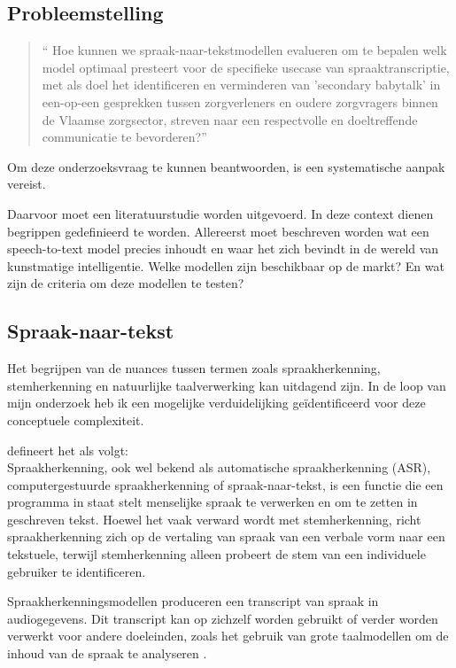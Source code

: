 \subsection{Probleemstelling}
\begin{quote}
   `` Hoe kunnen we spraak-naar-tekstmodellen evalueren om te bepalen welk model optimaal presteert voor de specifieke usecase van spraaktranscriptie, met als doel het identificeren en verminderen van 'secondary babytalk' in een-op-een gesprekken tussen zorgverleners en oudere zorgvragers binnen de Vlaamse zorgsector, streven naar een respectvolle en doeltreffende communicatie te bevorderen?''

\end{quote}

Om deze onderzoeksvraag te kunnen beantwoorden, is een systematische aanpak vereist.

Daarvoor moet een literatuurstudie worden uitgevoerd. In deze context dienen begrippen gedefinieerd te worden. Allereerst moet beschreven worden wat een speech-to-text model precies inhoudt en waar het zich bevindt in de wereld van kunstmatige intelligentie. Welke modellen zijn beschikbaar op de markt? En wat zijn de criteria om deze modellen te testen?

\subsection{Spraak-naar-tekst}

Het begrijpen van de nuances tussen termen zoals spraakherkenning, stemherkenning en natuurlijke taalverwerking kan uitdagend zijn. In de loop van mijn onderzoek heb ik een mogelijke verduidelijking geïdentificeerd voor deze conceptuele complexiteit.

\autocite{IBM} defineert het als volgt: \\Spraakherkenning, ook wel bekend als automatische spraakherkenning (ASR), computergestuurde spraakherkenning of spraak-naar-tekst, is een functie die een programma in staat stelt menselijke spraak te verwerken en om te zetten in geschreven tekst. Hoewel het vaak verward wordt met stemherkenning, richt spraakherkenning zich op de vertaling van spraak van een verbale vorm naar een tekstuele, terwijl stemherkenning alleen probeert de stem van een individuele gebruiker te identificeren.

Spraakherkenningsmodellen produceren een transcript van spraak in audiogegevens. Dit transcript kan op zichzelf worden gebruikt of verder worden verwerkt voor andere doeleinden, zoals het gebruik van grote taalmodellen om de inhoud van de spraak te analyseren \autocite{OConnor2023}.

